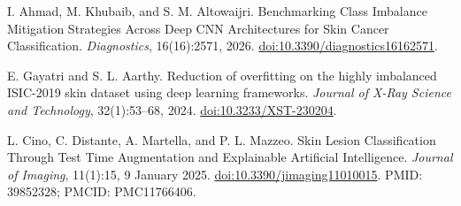 I. Ahmad, M. Khubaib, and S. M. Altowaijri.
Benchmarking Class Imbalance Mitigation Strategies Across Deep CNN Architectures for Skin Cancer Classification.
\emph{Diagnostics}, 16(16):2571, 2026.
\href{https://doi.org/10.3390/diagnostics16162571}{doi:10.3390/diagnostics16162571}.

E. Gayatri and S. L. Aarthy.
Reduction of overfitting on the highly imbalanced ISIC-2019 skin dataset using deep learning frameworks.
\emph{Journal of X-Ray Science and Technology}, 32(1):53--68, 2024.
\href{https://doi.org/10.3233/XST-230204}{doi:10.3233/XST-230204}.

L. Cino, C. Distante, A. Martella, and P. L. Mazzeo.
Skin Lesion Classification Through Test Time Augmentation and Explainable Artificial Intelligence.
\emph{Journal of Imaging}, 11(1):15, 9 January 2025.
\href{https://doi.org/10.3390/jimaging11010015}{doi:10.3390/jimaging11010015}.
PMID: 39852328; PMCID: PMC11766406.
